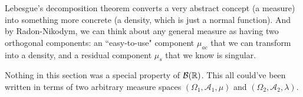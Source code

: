 \documentclass[twoside,10pt]{article}
\begin{document}
Lebesgue's decomposition theorem converts a very abstract concept (a measure) into something more concrete (a density, which is just a normal function). And by Radon-Nikodym, we can think about any general measure as having two orthogonal components: an ``easy-to-use" component $\mu_{ac}$ that we can transform into a density, and a residual component $\mu_{s}$ that we know is singular.

\begin{note}[]
Nothing in this section was a special property of $\mathcal{B}(\mathbb{R})$. This all could've been written in terms of two arbitrary measure spaces $(\Omega_1, \mathcal{A}_1, \mu)$ and $(\Omega_2, \mathcal{A}_{2}, \lambda)$.
\end{note}
\end{document}
